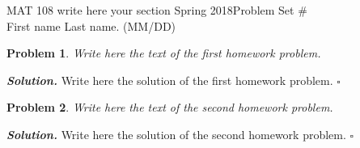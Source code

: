 \documentclass[12pt]{article}
\newtheorem{problem}{Problem}
\newenvironment{solution}[1][\it{Solution}]{\textbf{#1. } }{$\square$}
\begin{document}
 	\noindent MAT 108 write here your section Spring 2018\hfill Problem Set \#\\
 	First name Last name. (MM/DD)
 	
 	\hrulefill
 	
 	\begin{problem}
 		Write here the text of the first homework problem.
 	\end{problem}
 	\begin{solution}
 		Write here the solution of the first homework problem.
 	\end{solution} 
 	
 	\begin{problem}
 		Write here the text of the second homework problem.
 	\end{problem}
 	\begin{solution}
 		Write here the solution of the second homework problem.
 	\end{solution}
 	
 	
 
\end{document}
